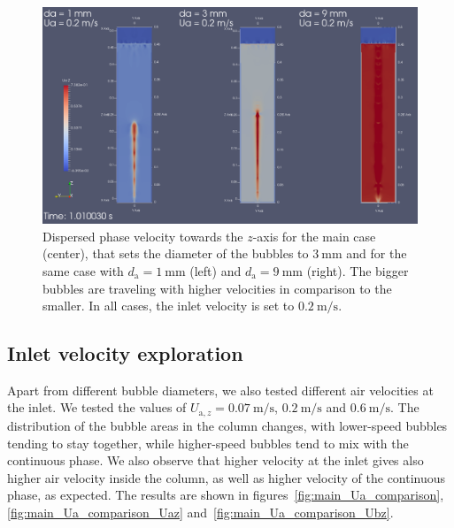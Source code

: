 \documentclass[11pt, a4paper, twoside]{article}
\begin{document}
\begin{figure}
    \centering
    \includegraphics[width=\textwidth]{figures/main/da_comparison_1_3_9_Uaz}
    \caption{Dispersed phase velocity towards the $z$-axis for the main case (center), that sets the diameter of the bubbles to $\SI{3}{\milli\metre}$ and for the same case with $d_\mathrm{a}=\SI{1}{\milli\metre}$ (left) and $d_\mathrm{a}=\SI{9}{\milli\metre}$ (right). The bigger bubbles are traveling with higher velocities in comparison to the smaller. In all cases, the inlet velocity is set to $\SI{0.2}{\metre/\second}$.}
    \label{fig:main_da_comparison_Uaz}
\end{figure}

\subsection{Inlet velocity exploration}
Apart from different bubble diameters, we also tested different air velocities at the inlet. We tested the values of $U_{\mathrm{a},z} = \SI{0.07}{\metre/\second}$, $\SI{0.2}{\metre/\second}$ and $\SI{0.6}{\metre/\second}$. The distribution of the bubble areas in the column changes, with lower-speed bubbles tending to stay together, while higher-speed bubbles tend to mix with the continuous phase. We also observe that higher velocity at the inlet gives also higher air velocity inside the column, as well as higher velocity of the continuous phase, as expected. The results are shown in figures~\ref{fig:main_Ua_comparison}, \ref{fig:main_Ua_comparison_Uaz} and~\ref{fig:main_Ua_comparison_Ubz}.
\end{document}
